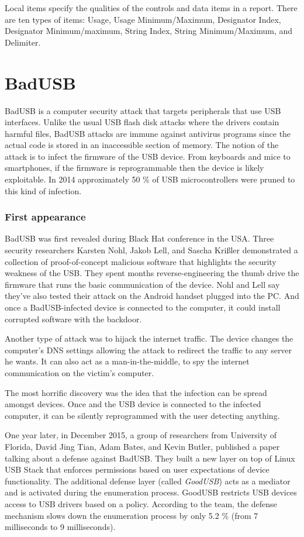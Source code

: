 Local items specify the qualities of the controls and data items in a report. There are ten types of items: Usage, Usage Minimum/Maximum, Designator Index, Designator Minimum/maximum, String Index, String Minimum/Maximum, and Delimiter.
\chapter{BadUSB}
\label{badusb}

BadUSB is a computer security attack that targets peripherals that use USB interfaces. Unlike the usual USB flash disk attacks where the drivers contain harmful files, BadUSB attacks are immune against antivirus programs since the actual code is stored in an inaccessible section of memory. The notion of the attack is to infect the firmware of the USB device. From keyboards and mice to smartphones, if the firmware is reprogrammable then the device is likely exploitable. In 2014 approximately 50 \% of USB microcontrollers  were pruned to this kind of infection.

\subsection*{First appearance}
BadUSB was first revealed during Black Hat conference in the USA. Three security researchers Karsten Nohl, Jakob Lell, and Sascha Krißler demonstrated a collection of proof-of-concept malicious software that highlights the security weakness of the USB\cite{BlackHat}. They spent months reverse-engineering the thumb drive the firmware that runs the basic communication of the device. Nohl and Lell say they've also tested their attack on the Android handset plugged into the PC. And once a BadUSB-infected device is connected to the computer, it could install corrupted software with the backdoor.

Another type of attack was to hijack the internet traffic. The device changes the computer's DNS settings allowing the attack to redirect the traffic to any server he wants. It can also act as a man-in-the-middle, to spy the internet communication on the victim's computer.

The most horrific discovery was the idea that the infection can be spread amongst devices. Once and the USB device is connected to the infected computer, it can be silently reprogrammed with the user detecting anything.

One year later, in December 2015, a group of researchers from University of Florida, David Jing Tian, Adam Bates, and Kevin Butler, published a paper talking about a defense against BadUSB. They built a new layer on top of Linux USB Stack that enforces permissions based on user expectations of device functionality. The additional defense layer (called \emph{GoodUSB}) acts as a mediator and is activated during the enumeration process. GoodUSB restricts USB devices access to USB drivers based on a policy. According to the team, the defense mechanism slows down the enumeration process by only 5.2 \% (from 7 milliseconds to 9 milliseconds)\cite{goodusb}.

